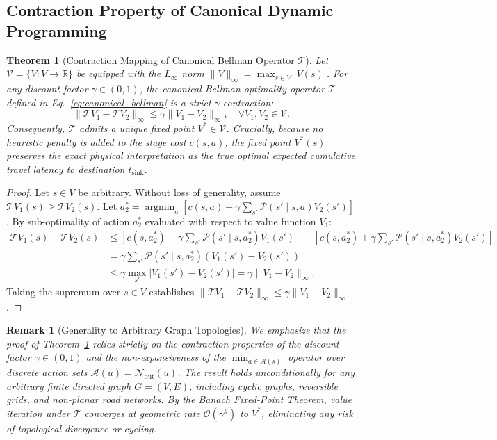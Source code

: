\documentclass[11pt,a4paper]{article}
\newtheorem{theorem}{Theorem}
\newtheorem{remark}{Remark}
\begin{document}
\subsection{Contraction Property of Canonical Dynamic Programming}
\begin{theorem}[Contraction Mapping of Canonical Bellman Operator $\mathcal{T}$]
\label{thm:contraction}
Let $\mathcal{V} = \{V: V \to \mathbb{R}\}$ be equipped with the $L_\infty$ norm $\|V\|_\infty = \max_{s \in V} |V(s)|$. For any discount factor $\gamma \in (0, 1)$, the canonical Bellman optimality operator $\mathcal{T}$ defined in Eq.~\eqref{eq:canonical_bellman} is a strict $\gamma$-contraction:
\begin{equation}
\|\mathcal{T} V_1 - \mathcal{T} V_2\|_\infty \le \gamma \|V_1 - V_2\|_\infty, \quad \forall V_1, V_2 \in \mathcal{V}.
\end{equation}
Consequently, $\mathcal{T}$ admits a unique fixed point $V^* \in \mathcal{V}$. Crucially, because no heuristic penalty is added to the stage cost $c(s, a)$, the fixed point $V^*(s)$ preserves the exact physical interpretation as the true optimal expected cumulative travel latency to destination $t_{\text{sink}}$.
\end{theorem}

\begin{proof}
Let $s \in V$ be arbitrary. Without loss of generality, assume $\mathcal{T} V_1(s) \ge \mathcal{T} V_2(s)$. Let $a_2^* = \operatorname{argmin}_a [ c(s, a) + \gamma \sum_{s'} \mathcal{P}(s' \mid s, a) V_2(s') ]$. By sub-optimality of action $a_2^*$ evaluated with respect to value function $V_1$:
\begin{align*}
\mathcal{T} V_1(s) - \mathcal{T} V_2(s) &\le \left[ c(s, a_2^*) + \gamma \sum_{s'} \mathcal{P}(s' \mid s, a_2^*) V_1(s') \right] - \left[ c(s, a_2^*) + \gamma \sum_{s'} \mathcal{P}(s' \mid s, a_2^*) V_2(s') \right] \\
&= \gamma \sum_{s'} \mathcal{P}(s' \mid s, a_2^*) (V_1(s') - V_2(s')) \\
&\le \gamma \max_{s'} |V_1(s') - V_2(s')| = \gamma \|V_1 - V_2\|_\infty.
\end{align*}
Taking the supremum over $s \in V$ establishes $\|\mathcal{T} V_1 - \mathcal{T} V_2\|_\infty \le \gamma \|V_1 - V_2\|_\infty$.
\end{proof}

\begin{remark}[Generality to Arbitrary Graph Topologies]
We emphasize that the proof of Theorem~\ref{thm:contraction} relies strictly on the contraction properties of the discount factor $\gamma \in (0, 1)$ and the non-expansiveness of the $\min_{a \in \mathcal{A}(s)}$ operator over discrete action sets $\mathcal{A}(u) = \mathcal{N}_{\text{out}}(u)$. The result holds unconditionally for \textit{any arbitrary finite directed graph} $G = (V, E)$, including cyclic graphs, reversible grids, and non-planar road networks. By the Banach Fixed-Point Theorem, value iteration under $\mathcal{T}$ converges at geometric rate $\mathcal{O}(\gamma^k)$ to $V^*$, eliminating any risk of topological divergence or cycling.
\end{remark}
\end{document}
